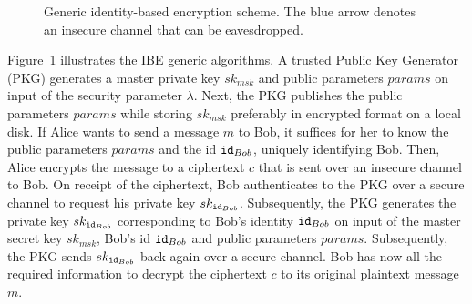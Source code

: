 \begin{figure}[ht]
\begin{center}
{
    }
    \end{center}
    \caption{Generic identity-based encryption scheme. The blue arrow denotes an insecure channel that can be eavesdropped.}
    \label{fig:generic_ibe_scheme}
\end{figure}

Figure~\ref{fig:generic_ibe_scheme} illustrates the IBE generic algorithms. A trusted Public Key Generator (PKG) generates a master private key $sk_{msk}$ and public parameters $params$ on input of the security parameter $\lambda$. Next, the PKG publishes the public parameters $params$ while storing $sk_{msk}$ preferably in encrypted format on a local disk. If Alice wants to send a message $m$ to Bob, it suffices for her to know the public parameters $params$ and the id $\mathtt{id}_{Bob}$, uniquely identifying Bob. Then, Alice encrypts the message to a ciphertext $c$ that is sent over an insecure channel to Bob. On receipt of the ciphertext, Bob authenticates to the PKG over a secure channel to request his private key $sk_{\mathtt{id}_{Bob}}$. Subsequently, the PKG generates the private key $sk_{\mathtt{id}_{Bob}}$ corresponding to Bob's identity $\mathtt{id}_{Bob}$ on input of the master secret key $sk_{msk}$, Bob's id $\mathtt{id}_{Bob}$ and public parameters $params$. Subsequently, the PKG sends $sk_{\mathtt{id}_{Bob}}$ back again over a secure channel. Bob has now all the required information to decrypt the ciphertext $c$ to its original plaintext message $m$.

